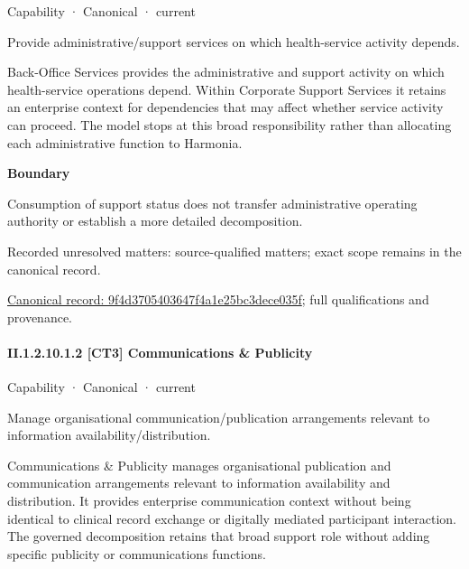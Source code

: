 \label{element:9f4d3705403647f4a1e25bc3dece035f}
{\small Capability · Canonical · current}\par

Provide administrative/support services on which health-service activity depends.



Back-Office Services provides the administrative and support activity on which health-service operations depend. Within Corporate Support Services it retains an enterprise context for dependencies that may affect whether service activity can proceed. The model stops at this broad responsibility rather than allocating each administrative function to Harmonia.



\textbf{Boundary}



Consumption of support status does not transfer administrative operating authority or establish a more detailed decomposition.


{\small Recorded unresolved matters: source-qualified matters; exact scope remains in the canonical record.}\par
{\footnotesize \href{../../../../continuum/strategy/capability/9f4d3705403647f4a1e25bc3dece035f.md}{Canonical record: 9f4d3705403647f4a1e25bc3dece035f}; full qualifications and provenance.}\par
\paragraph*{II.1.2.10.1.2 [CT3] Communications \& Publicity}
\label{navigation:II.1.2.10.1.2}

\label{element:1fec53fb12444abcac41094dace1d3c2}
{\small Capability · Canonical · current}\par

Manage organisational communication/publication arrangements relevant to information availability/distribution.



Communications \& Publicity manages organisational publication and communication arrangements relevant to information availability and distribution. It provides enterprise communication context without being identical to clinical record exchange or digitally mediated participant interaction. The governed decomposition retains that broad support role without adding specific publicity or communications functions.



